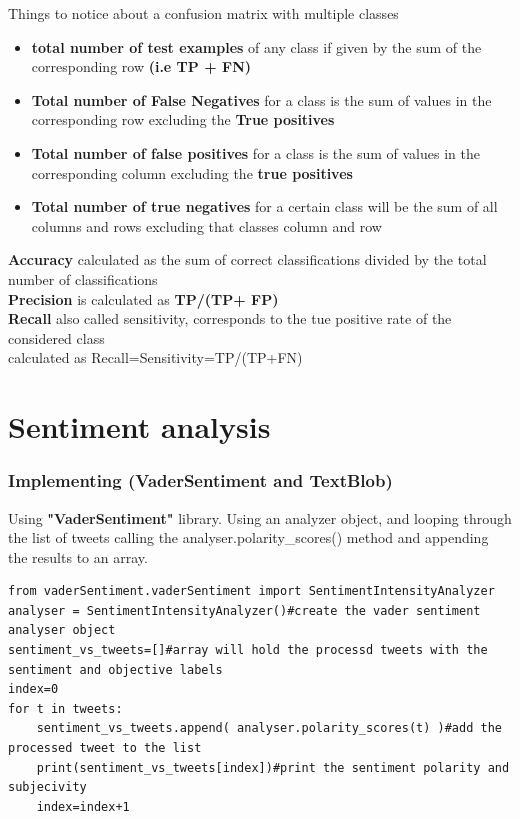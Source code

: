 Things to notice about a confusion matrix with multiple classes
\begin{itemize}
\item \textbf{total number of test examples} of any class if given by the sum of the corresponding row \textbf{(i.e TP + FN)}
\item \textbf{Total number of False Negatives} for a class is the sum of values in the corresponding row excluding the \textbf{True positives}

\item \textbf{Total number of false positives} for a class is the sum of values in the corresponding column excluding the \textbf{true positives}

\item \textbf{Total number of true negatives} for a certain class will be the sum of all columns and rows  excluding that classes column and row
\end{itemize}
  
\textbf{Accuracy} calculated as the sum of correct classifications divided by the total number of classifications\\
\textbf{Precision} is calculated as \textbf{ TP/(TP+ FP)}\\
\textbf{Recall} also called sensitivity, corresponds to the tue positive rate of the considered class
\\
calculated as Recall=Sensitivity=TP/(TP+FN)

\clearpage



\chapter{Sentiment analysis}

\subsection{Implementing (VaderSentiment and TextBlob)}


Using \textbf{"VaderSentiment"} library. Using an analyzer object, and looping through the list of tweets  calling the analyser.polarity\_scores() method and appending the results to an array.

\begin{lstlisting}
from vaderSentiment.vaderSentiment import SentimentIntensityAnalyzer
analyser = SentimentIntensityAnalyzer()#create the vader sentiment analyser object
sentiment_vs_tweets=[]#array will hold the processd tweets with the sentiment and objective labels
index=0
for t in tweets:
    sentiment_vs_tweets.append( analyser.polarity_scores(t) )#add the processed tweet to the list
    print(sentiment_vs_tweets[index])#print the sentiment polarity and subjecivity
    index=index+1
\end{lstlisting}


